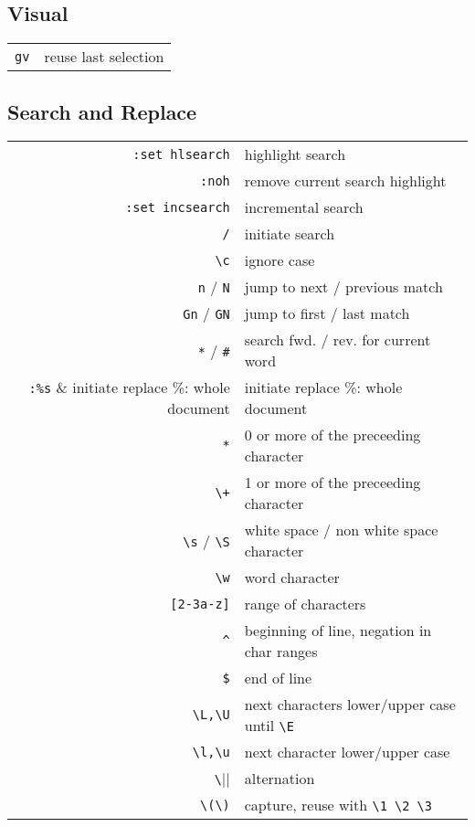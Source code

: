 \begin{multicols*}{3}
\subsection{Visual}
\begin{tabular}{@{}rl@{}}
    \verb|gv| & reuse last selection
\end{tabular}

\subsection{Search and Replace}
\begin{tabular}{@{}rl@{}}
    \verb|:set hlsearch| & highlight search \\
    \verb|:noh|      & remove current search highlight \\
    \verb|:set incsearch| & incremental search \\
    \verb|/|        & initiate search \\
    \verb|\c|      & ignore case \\
    \verb|n| / \verb|N| & jump to next / previous match \\
    \verb|Gn| / \verb|GN| & jump to first / last match \\
    \verb|*| / \verb|#| & search fwd. / rev. for current word \\
    \verb|:%s|      & initiate replace \%: whole document \\
    \verb|*|        & 0 or more of the preceeding character \\
    \verb|\+|       & 1 or more of the preceeding character \\
    \verb|\s| / \verb|\S|      & white space / non white space character \\
    \verb|\w|       & word character \\
    \verb|[2-3a-z]| & range of characters \\
    \verb|^|        & beginning of line, negation in char ranges \\
    \verb|$|        & end of line \\
    \verb|\L,\U|    & next characters lower/upper case until \verb|\E| \\
    \verb|\l,\u|    & next character lower/upper case \\
    \verb|\||       & alternation \\
    \verb|\(\)|     & capture, reuse with \verb|\1 \2 \3|
\end{tabular}


\end{multicols*}
